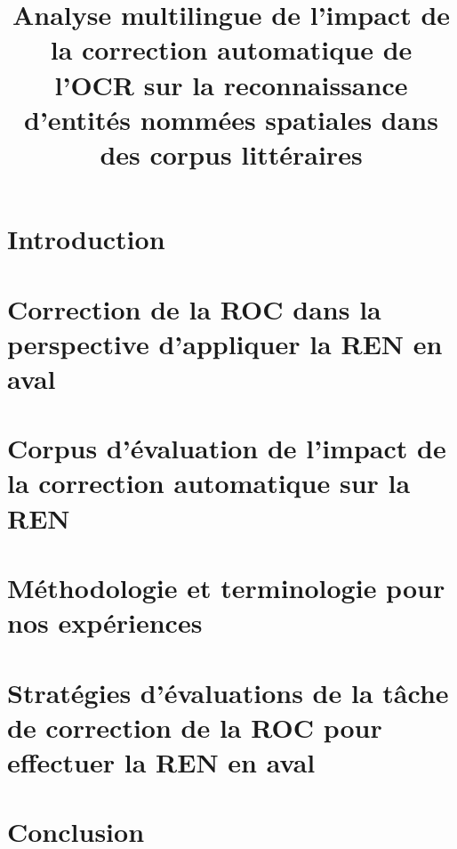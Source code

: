 \documentclass[utf8x]{article-hermes_frenchb}
\title[Contamination des OCR sur la REN]{Analyse multilingue de l'impact de la correction automatique de l'OCR sur la reconnaissance d’entités nommées spatiales dans des corpus littéraires}
\begin{document}
\maketitlepage

\newcommand{\fakesentence}{Attention à ce que les figures et les tableaux ne débordent pas dans les marges. }
\newcommand{\fakeparagraph}{
\fakesentence
\fakesentence
\fakesentence
\fakesentence
\fakesentence
\fakesentence
}

\newcommand{\TAL}{traitement automatique des langues}

\newcommand{\CAD}{c'est-à-dire}
\newcommand{\COLL}{et collègues}
\newcommand{\PEX}{par exemple}
\newcommand{\POPP}{par opposition à}

\newcommand{\cad}{c.-à-d.}
\newcommand{\coll}{et~coll.}
\newcommand{\pex}{p.~ex.}
\newcommand{\popp}{p.~opp.}

\section{Introduction}




\section{Correction de la ROC dans la perspective d'appliquer la REN en aval}

\label{sec:sota}

\section{Corpus d'évaluation de l'impact de la correction automatique sur la REN}
\label{sec:data}



\section{Méthodologie et terminologie pour nos expériences}

\label{sec:Meth}
\section{Stratégies d'évaluations de la tâche de correction de la ROC pour effectuer la REN en aval}
\label{sec:expe}






\section{Conclusion}

\label{sec:concl}



\end{document}
